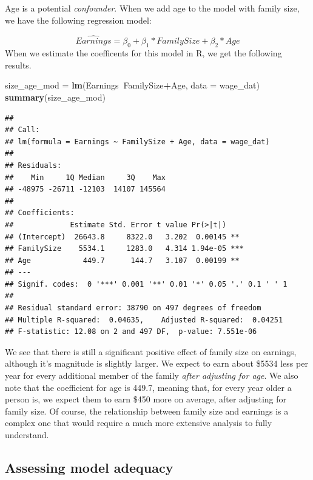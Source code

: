 \documentclass[]{book}
\newenvironment{Shaded}{\begin{snugshade}}{\end{snugshade}}
\newcommand{\DataTypeTok}[1]{\textcolor[rgb]{0.13,0.29,0.53}{#1}}
\newcommand{\KeywordTok}[1]{\textcolor[rgb]{0.13,0.29,0.53}{\textbf{#1}}}
\newcommand{\NormalTok}[1]{#1}
\newcommand{\OperatorTok}[1]{\textcolor[rgb]{0.81,0.36,0.00}{\textbf{#1}}}
\newcommand{\StringTok}[1]{\textcolor[rgb]{0.31,0.60,0.02}{#1}}
\begin{document}
Age is a potential \emph{confounder}. When we add age to the model with family size, we have the following regression model:

\[\widehat{Earnings}=\beta_0+\beta_1*FamilySize+\beta_2*Age\]
When we estimate the coefficents for this model in R, we get the following results.

\begin{Shaded}
\begin{Highlighting}[]
\NormalTok{size_age_mod =}\StringTok{ }\KeywordTok{lm}\NormalTok{(Earnings}\OperatorTok{~}\NormalTok{FamilySize}\OperatorTok{+}\NormalTok{Age, }\DataTypeTok{data =}\NormalTok{ wage_dat)}
\KeywordTok{summary}\NormalTok{(size_age_mod)}
\end{Highlighting}
\end{Shaded}

\begin{verbatim}
## 
## Call:
## lm(formula = Earnings ~ FamilySize + Age, data = wage_dat)
## 
## Residuals:
##    Min     1Q Median     3Q    Max 
## -48975 -26711 -12103  14107 145564 
## 
## Coefficients:
##             Estimate Std. Error t value Pr(>|t|)    
## (Intercept)  26643.8     8322.0   3.202  0.00145 ** 
## FamilySize    5534.1     1283.0   4.314 1.94e-05 ***
## Age            449.7      144.7   3.107  0.00199 ** 
## ---
## Signif. codes:  0 '***' 0.001 '**' 0.01 '*' 0.05 '.' 0.1 ' ' 1
## 
## Residual standard error: 38790 on 497 degrees of freedom
## Multiple R-squared:  0.04635,    Adjusted R-squared:  0.04251 
## F-statistic: 12.08 on 2 and 497 DF,  p-value: 7.551e-06
\end{verbatim}

We see that there is still a significant positive effect of family size on earnings, although it's magnitude is slightly larger. We expect to earn about \$5534 less per year for every additional member of the family \emph{after adjusting for age}. We also note that the coefficient for age is 449.7, meaning that, for every year older a person is, we expect them to earn \$450 more on average, after adjusting for family size. Of course, the relationship between family size and earnings is a complex one that would require a much more extensive analysis to fully understand.

\hypertarget{assessing-model-adequacy-1}{%
\subsection{Assessing model adequacy}\label{assessing-model-adequacy-1}}
\end{document}
